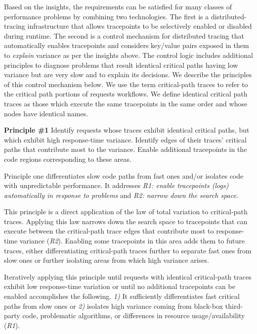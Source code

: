 Based on the insights, the requirements can be satisfied for many
classes of performance problems by combining two technologies.  The
first is a distributed-tracing infrastructure that allows tracepoints
to be selectively enabled or disabled during runtime.  The second is a
control mechanism for distributed tracing that automatically enables
tracepoints and considers key/value pairs exposed in them
to \textit{explain} variance as per the insights above.  The control
logic includes additional principles to diagnose problems that result
identical critical paths having low variance but are very slow and to
explain its decisions.  We describe the principles of this control
mechanism below.  We use the term critical-path traces to refer to the
critical path portions of requests workflows.  We define identical
critical path traces as those which execute the same tracepoints in
the same order and whose nodes have identical names.

%

\noindent\textbf{Principle \#1} Identify requests whose traces exhibit
identical critical paths, but which exhibit high response-time
variance. Identify edges of their traces' critical paths that
contribute most to the variance.  Enable additional tracepoints in
the code regions corresponding to these areas.

Principle one differentiates slow code paths from fast ones and/or
isolates code with unpredictable performance.  It addresses
\textit{R1: enable tracepoints (logs) automatically in response to
  problems} and \textit{R2: narrow down the search space}.


This principle is a direct application of the law of total variation
to critical-path traces.  Applying this law narrows down the search
space to tracepoints that can execute between the critical-path trace
edges that contribute most to response-time variance (\textit{R2}).
Enabling some tracepoints in this area adds them to future traces,
either differentiating critical-path traces further to separate fast
ones from slow ones or further isolating areas from which high
variance arises.


Iteratively applying this principle until requests with identical
critical-path traces exhibit low response-time variation or until no
additional tracepoints can be enabled accomplishes the
following.  \textit{1)} It sufficiently differentiates fast critical
paths from slow ones or
\textit{2)} isolates high variance coming from black-box third-party
code, problematic algorithms, or differences in resource
usage/availability (\textit{R1}).

